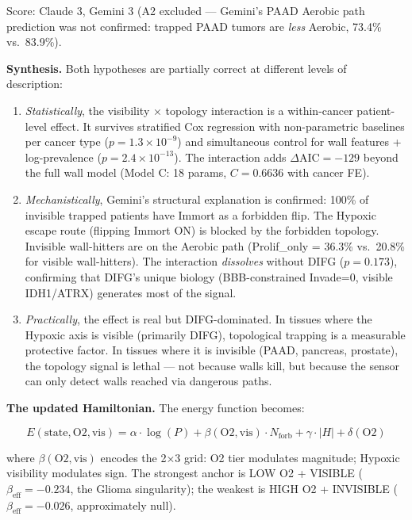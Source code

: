 \documentclass[
  11pt,
]{article}
\begin{document}
Score: Claude 3, Gemini 3 (A2 excluded --- Gemini's PAAD Aerobic path
prediction was not confirmed: trapped PAAD tumors are \emph{less}
Aerobic, 73.4\% vs.~83.9\%).

\textbf{Synthesis.} Both hypotheses are partially correct at different
levels of description:

\begin{enumerate}
\def\labelenumi{\arabic{enumi}.}
\item
  \emph{Statistically}, the visibility × topology interaction is a
  within-cancer patient-level effect. It survives stratified Cox
  regression with non-parametric baselines per cancer type
  (\(p = 1.3 \times 10^{-9}\)) and simultaneous control for wall
  features + log-prevalence (\(p = 2.4 \times 10^{-13}\)). The
  interaction adds \(\Delta\mathrm{AIC} = -129\) beyond the full wall
  model (Model C: 18 params, \(C = 0.6636\) with cancer FE).
\item
  \emph{Mechanistically}, Gemini's structural explanation is confirmed:
  100\% of invisible trapped patients have Immort as a forbidden flip.
  The Hypoxic escape route (flipping Immort ON) is blocked by the
  forbidden topology. Invisible wall-hitters are on the Aerobic path
  (Prolif\_only = 36.3\% vs.~20.8\% for visible wall-hitters). The
  interaction \emph{dissolves} without DIFG (\(p = 0.173\)), confirming
  that DIFG's unique biology (BBB-constrained Invade=0, visible
  IDH1/ATRX) generates most of the signal.
\item
  \emph{Practically}, the effect is real but DIFG-dominated. In tissues
  where the Hypoxic axis is visible (primarily DIFG), topological
  trapping is a measurable protective factor. In tissues where it is
  invisible (PAAD, pancreas, prostate), the topology signal is lethal
  --- not because walls kill, but because the sensor can only detect
  walls reached via dangerous paths.
\end{enumerate}

\textbf{The updated Hamiltonian.} The energy function becomes:

\[E(\mathrm{state}, \mathrm{O2}, \mathrm{vis}) = \alpha \cdot \log(P) + \beta(\mathrm{O2}, \mathrm{vis}) \cdot N_{\mathrm{forb}} + \gamma \cdot |H| + \delta(\mathrm{O2})\]

where \(\beta(\mathrm{O2}, \mathrm{vis})\) encodes the 2×3 grid: O2 tier
modulates magnitude; Hypoxic visibility modulates sign. The strongest
anchor is LOW O2 + VISIBLE (\(\beta_{\mathrm{eff}} = -0.234\), the
Glioma singularity); the weakest is HIGH O2 + INVISIBLE
(\(\beta_{\mathrm{eff}} = -0.026\), approximately null).
\end{document}
